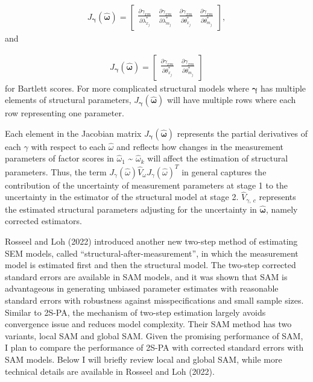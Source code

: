 \documentclass[
  11pt,
  man]{apa6}
\begin{document}
\begin{align}
J_{\boldsymbol{\gamma}}(\boldsymbol{\hat{\omega}}) = 
\begin{bmatrix}
\frac{\partial \gamma_{xm}}{\partial \lambda_{x_{j}}^*} & \frac{\partial \gamma_{xm}}{\partial \lambda_{m_{j}}^*} & \frac{\partial \gamma_{xm}}{\partial \theta_{x_{j}}^*} & \frac{\partial \gamma_{xm}}{\partial \theta_{m_{j}}^*}
\end{bmatrix},
\end{align}
and

\begin{align}
J_{\boldsymbol{\gamma}}(\boldsymbol{\hat{\omega}}) = 
\begin{bmatrix}
\frac{\partial \gamma_{xm}}{\partial \theta_{x_{j}}^*} & \frac{\partial \gamma_{xm}}{\partial \theta_{m_{j}}^*}
\end{bmatrix}
\end{align}
for Bartlett scores. For more complicated structural models where \(\boldsymbol{\gamma}\) has multiple elements of structural parameters, \(J_{\boldsymbol{\gamma}}(\boldsymbol{\hat{\omega}})\) will have multiple rows where each row representing one parameter.

Each element in the Jacobian matrix \(J_{\boldsymbol{\gamma}}(\boldsymbol{\hat{\omega}})\) represents the partial derivatives of each \(\gamma\) with respect to each \(\hat{\omega}\) and reflects how changes in the measurement parameters of factor scores in \(\hat{\omega}_{1}\) \textasciitilde{} \(\hat{\omega}_{k}\) will affect the estimation of structural parameters. Thus, the term \(J_{\gamma}(\hat{\omega}) \hat{V}_{\omega} J_{\gamma}(\hat{\omega})^T\) in general captures the contribution of the uncertainty of measurement parameters at stage 1 to the uncertainty in the estimator of the structural model at stage 2. \(\hat{V}_{\gamma,\ c}\) represents the estimated structural parameters adjusting for the uncertainty in \(\boldsymbol{\hat{\omega}}\), namely corrected estimators.

Rosseel and Loh (2022) introduced another new two-step method of estimating SEM models, called ``structural-after-measurement'', in which the measurement model is estimated first and then the structural model. The two-step corrected standard errors are available in SAM models, and it was shown that SAM is advantageous in generating unbiased parameter estimates with reasonable standard errors with robustness against misspecifications and small sample sizes. Similar to 2S-PA, the mechanism of two-step estimation largely avoids convergence issue and reduces model complexity. Their SAM method has two variants, local SAM and global SAM. Given the promising performance of SAM, I plan to compare the performance of 2S-PA with corrected standard errors with SAM models. Below I will briefly review local and global SAM, while more technical details are available in Rosseel and Loh (2022).
\end{document}
